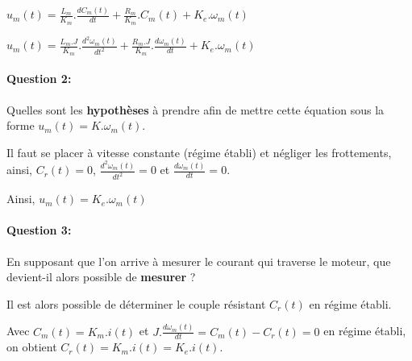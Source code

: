 $u_m(t)=\frac{L_m}{K_m}.\frac{dC_m(t)}{dt}+\frac{R_m}{K_m}.C_m(t)+K_e.\omega_m(t)$

$u_m(t)=\frac{L_m.J}{K_m}.\frac{d^2\omega_m(t)}{dt^2}+\frac{R_m.J}{K_m}.\frac{d\omega_m(t)}{dt}+K_e.\omega_m(t)$


\paragraph{Question 2:} Quelles sont les \textbf{hypothèses} à prendre afin de mettre cette équation sous la forme $u_m(t)=K.\omega_m(t)$.

Il faut se placer à vitesse constante (régime établi) et négliger les frottements, ainsi, $C_r(t)=0$, $\frac{d^2\omega_m(t)}{dt^2}=0$ et $\frac{d\omega_m(t)}{dt}=0$.

Ainsi, $u_m(t)=K_e.\omega_m(t)$

\paragraph{Question 3:} En supposant que l'on arrive à mesurer le courant qui traverse le moteur, que devient-il alors possible de \textbf{mesurer} ?

Il est alors possible de déterminer le couple résistant $C_r(t)$ en régime établi.

Avec $C_m(t)=K_m.i(t)$ et $J.\frac{d\omega_m(t)}{dt}=C_m(t)-C_r(t)=0$ en régime établi, on obtient $C_r(t)=K_m.i(t)=K_e.i(t)$.



